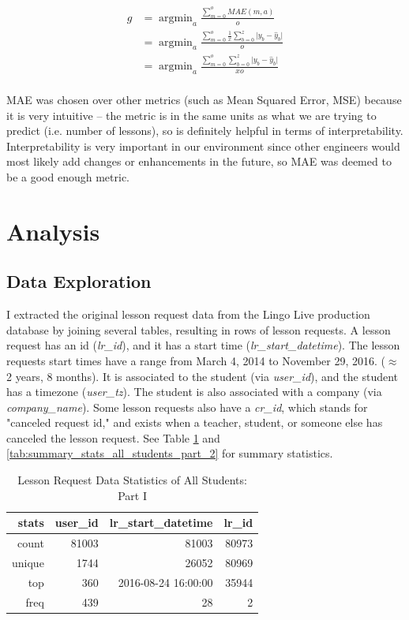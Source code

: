 \documentclass[oneside]{article}
\DeclareMathOperator*{\argmin}{argmin}
\begin{document}
\begin{align}
  g &= \argmin_{a}{\frac{ \sum_{m=0}^{o}{MAE(m,a)} }{o}}\\
    &= \argmin_{a}{\frac{ \sum_{m=0}^{o}{ \frac{1}{x}\sum_{b=0}^{z}{\lvert y_{b} - \hat{y}_{b} \rvert} } }{o}}\\
    &= \argmin_{a}{\frac{ \sum_{m=0}^{o}{ \sum_{b=0}^{z}{\lvert y_{b} - \hat{y}_{b} \rvert} } }{xo}}\\
\end{align}

MAE was chosen over other metrics (such as Mean Squared Error, MSE) because it is
very intuitive -- the metric is in the same units as what we are trying to
predict (i.e. number of lessons), so is definitely helpful in terms of
interpretability. Interpretability is very important in our environment since
other engineers would most likely add changes or enhancements in the future,
so MAE was deemed to be a good enough metric.

\section{Analysis}

\subsection{Data Exploration}

I extracted the original lesson request data from the Lingo Live production
database by joining several tables, resulting in rows of lesson requests. A
lesson request has an id (\emph{lr\_id}), and it has a start time
(\emph{lr\_start\_datetime}). The lesson requests start times have a range from
March 4, 2014 to November 29, 2016. ($\approx$ 2 years, 8 months).  It is
associated to the student (via \emph{user\_id}), and the student has a timezone
(\emph{user\_tz}). The student is also associated with a company (via
\emph{company\_name}).  Some lesson requests also have a \emph{cr\_id}, which
stands for "canceled request id," and exists when a teacher, student, or
someone else has canceled the lesson request. See Table
\ref{tab:summary_stats_all_students_part_1} and
\ref{tab:summary_stats_all_students_part_2} for summary statistics.

\begin{table}[]
  \centering
  \caption{Lesson Request Data Statistics of All Students: Part I}
  \label{tab:summary_stats_all_students_part_1}
  \begin{tabular}{rrrr}
    \hline
    \textbf{stats} & \textbf{user\_id} & \textbf{lr\_start\_datetime} & \textbf{lr\_id} \\
    \hline
    count   & 81003   & 81003    & 80973   \\
    unique    & 1744   & 26052    & 80969  \\
    top    & 360   & 2016-08-24 16:00:00   & 35944 \\
    freq    & 439   & 28    & 2   \\
    \hline
  \end{tabular}
\end{table}
\end{document}
